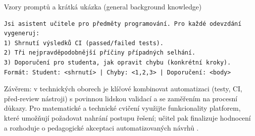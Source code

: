 Vzory promptů a krátká ukázka (general background knowledge)
\begin{verbatim}
Jsi asistent učitele pro předměty programování. Pro každé odevzdání vygeneruj:
1) Shrnutí výsledků CI (passed/failed tests).
2) Tři nejpravděpodobnější příčiny případných selhání.
3) Doporučení pro studenta, jak opravit chybu (konkrétní kroky).
Formát: Student: <shrnutí> | Chyby: <1,2,3> | Doporučení: <body>
\end{verbatim}

Závěrem: v technických oborech je klíčové kombinovat automatizaci (testy, CI, před‑review nástroji) s povinnou lidskou validací a se zaměřením na procesní důkazy. Pro matematické a technické cvičení využijte funkcionality platforem, které umožňují požadovat nahrání postupu řešení; učitel pak finalizuje hodnocení a rozhoduje o pedagogické akceptaci automatizovaných návrhů \cite{kb_ai_101_tipu_pdf_04e4a115_page_8_1,kb_ai_101_tipu_pdf_04e4a115_page_54_1}.